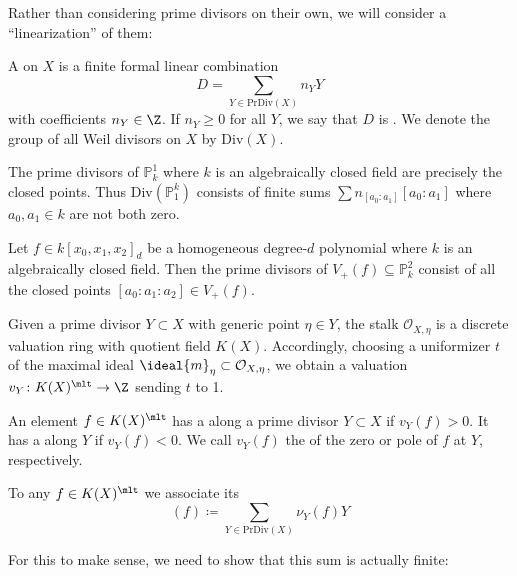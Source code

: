 \documentclass[wip, algebra]{bsteffan-lecturenotes}
\newcommand{\cO}{\mathcal{O}}
\renewcommand{\P}{\mathbb{P}}
\newcommand{\Div}{\mathrm{Div}}
\newcommand{\PrDiv}{\mathrm{PrDiv}}
\begin{document}
Rather than considering prime divisors on their own, we will consider a \enquote{linearization} of them:
\begin{definition}
	A  on $X$ is a finite formal linear combination 
	\begin{equation*}
		D = \sum_{Y \in \PrDiv(X)} n_Y Y
	\end{equation*}
	with coefficients $n_Y \in \Z$.
	If $n_Y \geq 0$ for all $Y$, we say that $D$ is .
	We denote the group of all Weil divisors on $X$ by $\Div(X)$.
\end{definition}
\begin{example}
	The prime divisors of $\P^1_k$ where $k$ is an algebraically closed field are precisely the closed points. 
	Thus $\Div(\P^k_1)$ consists of finite sums $\sum n_{[a_0 : a_1]} [a_0 : a_1]$ where $a_0, a_1 \in k$ are not both zero.
\end{example}
\begin{example}
	Let $f \in k[x_0, x_1, x_2]_d$ be a homogeneous degree-$d$ polynomial where $k$ is an algebraically closed field.
	Then the prime divisors of $V_+(f) \subseteq \P^2_k$ consist of all the closed points $[a_0 : a_1 : a_2] \in V_+(f)$.
\end{example}
Given a prime divisor $Y \subset X$ with generic point $\eta \in Y$, the stalk $\cO_{X, \eta}$ is a discrete valuation ring with quotient field $K(X)$.
Accordingly, choosing a uniformizer $t$ of the maximal ideal $\ideal{m}_\eta \subset \cO_{X, \eta}$, we obtain a valuation $v_Y\colon K(X)^\mlt \to \Z$ sending $t$ to 1.
\begin{definition}
	An element $f \in K(X)^\mlt$ has a  along a prime divisor $Y \subset X$ if $v_Y(f) > 0$.
	It has a  along $Y$ if $v_Y(f) < 0$.
	We call $v_Y(f)$ the  of the zero or pole of $f$ at $Y$, respectively.
\end{definition}
\begin{definition}
	To any $f \in K(X)^\mlt$ we associate its 
	\begin{equation*}
		(f) \coloneq \sum_{Y \in \PrDiv(X)} \nu_Y(f) Y
	\end{equation*}
\end{definition}
For this to make sense, we need to show that this sum is actually finite:
\end{document}
